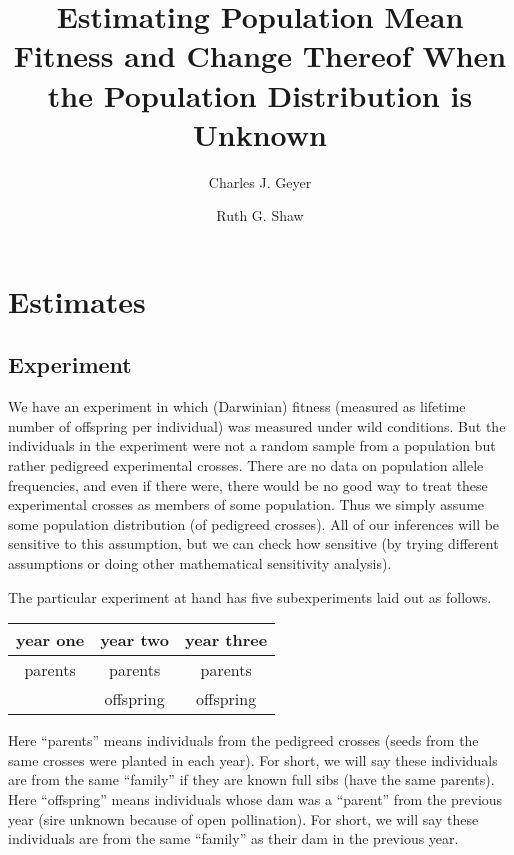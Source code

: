 \documentclass[11pt]{article}
\begin{document}
\title{Estimating Population Mean Fitness and Change Thereof When
    the Population Distribution is Unknown}

\author{Charles J. Geyer \and Ruth G. Shaw}

\maketitle

\section{Estimates}

\subsection{Experiment}

We have an experiment in which (Darwinian) fitness (measured as lifetime
number of offspring per individual) was measured under wild conditions.
But the individuals in the experiment were not a random sample from
a population but rather pedigreed experimental crosses.  There are no data on
population allele frequencies, and even if there were, there would be
no good way to treat these experimental crosses as members of some
population.  Thus we simply assume some population distribution (of
pedigreed crosses).  All of our inferences will be sensitive to this
assumption, but we can check how sensitive (by trying different assumptions
or doing other mathematical sensitivity analysis).

The particular experiment at hand has five subexperiments laid out as follows.
\begin{center}
\begin{tabular}{ccc}
year one & year two & year three \\
\hline
parents & parents & parents \\
        & offspring & offspring
\end{tabular}
\end{center}
Here ``parents'' means individuals from the pedigreed crosses (seeds from
the same crosses were planted in each year).  For short, we will say these
individuals are from the same ``family'' if they are known full sibs
(have the same parents).
Here ``offspring'' means individuals whose dam was a ``parent'' from the
previous year (sire unknown because of open pollination).
For short, we will say these
individuals are from the same ``family'' as their dam in the previous year.
\end{document}
